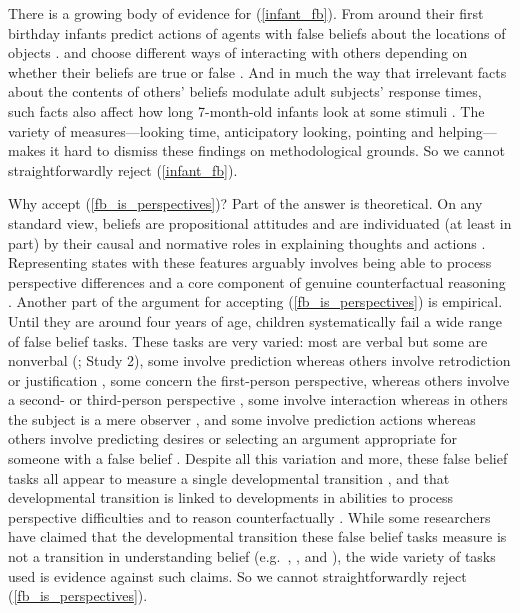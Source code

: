 \documentclass[12pt,\papersize]{extarticle}
\begin{document}
There is a growing body of evidence for (\ref{infant_fb}).
From around their first birthday infants  predict actions of agents with false beliefs about the locations of objects \citep[]{Onishi:2005hm, Southgate:2007js}. 
and choose different ways of interacting with others depending on whether their beliefs are true or false \citep[]{Buttelmann:2009gy,Knudsen:2011fk,southgate:2010fb}.  
And in much the way that irrelevant facts about the contents of others’ beliefs modulate adult subjects’ response times, such facts also affect how long 7-month-old infants look at some stimuli \citep[]{kovacs_social_2010}.
The variety of  measures---looking time, anticipatory looking, pointing and helping---makes it hard to dismiss these findings on methodological grounds.
So we cannot straightforwardly reject (\ref{infant_fb}).

Why accept (\ref{fb_is_perspectives})?  
Part of the answer is theoretical. 
On any standard view, beliefs are propositional attitudes and are individuated (at least in part) by their causal and normative roles in explaining thoughts and actions \citep[]{Davidson:1980xp, Davidson:1990du}.
Representing states with these features arguably involves being able to process perspective differences and a core component of genuine counterfactual reasoning \citep{perner:2007_objects}. 
Another part of the argument for accepting (\ref{fb_is_perspectives}) is empirical.
Until they are around four years of age,
children systematically fail a wide range of false belief tasks.
These tasks are very varied: most are verbal but some are nonverbal (\citealp{Call:1999co}; \citealp{low:2010_preschoolers} Study 2),
some involve prediction whereas others involve retrodiction or justification \citep[e.g.][]{Wimmer:1998kx},
some concern the first-person perspective, whereas others involve a second- or third-person perspective \citep[e.g.][]{Gopnik:1991db},
some involve interaction whereas in others the subject is a mere observer \citep[e.g.][]{Chandler:1989qa},
and some involve prediction actions whereas others involve predicting desires \citep{Astington:1991kk} or selecting an argument appropriate for someone with a false belief \citep{Bartsch:2000es}. 
Despite all this variation and more, these false belief tasks all appear to measure a single developmental transition \citep{Wellman:2001lz},
and that developmental transition is linked to developments in abilities to process perspective difficulties \citep{Perner:2002jj} and to reason counterfactually \citep{rafetseder:2012_submitted}.
While some researchers have claimed that the developmental transition these false belief tasks measure is not a transition in understanding belief 
	(e.g.\ 
	\citealp[][p.\ 417]{Carpenter:2002gc},
	\citealp{Bloom:2000bt}, and
	\citealp{Leslie:1998nq}),
the wide variety of tasks used is evidence against such claims.
So we cannot straightforwardly reject  (\ref{fb_is_perspectives}).
\end{document}
